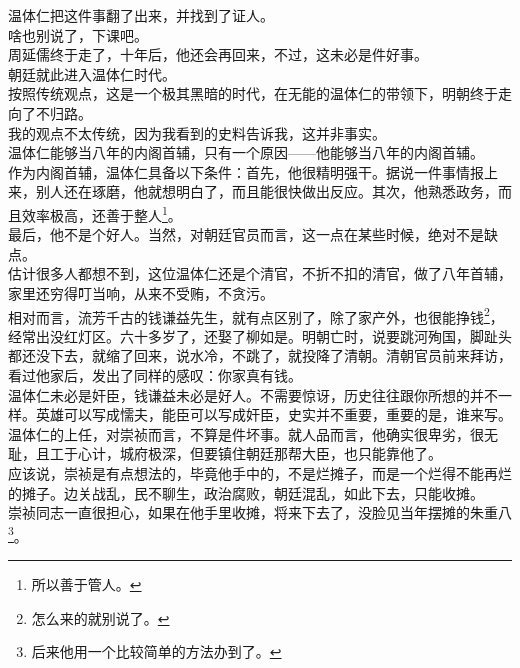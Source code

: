 \begin{multicols}{\theparacolNo}
温体仁把这件事翻了出来，并找到了证人。\\

啥也别说了，下课吧。\\

周延儒终于走了，十年后，他还会再回来，不过，这未必是件好事。\\

朝廷就此进入温体仁时代。\\

按照传统观点，这是一个极其黑暗的时代，在无能的温体仁的带领下，明朝终于走向了不归路。\\

我的观点不太传统，因为我看到的史料告诉我，这并非事实。\\

温体仁能够当八年的内阁首辅，只有一个原因——他能够当八年的内阁首辅。\\

作为内阁首辅，温体仁具备以下条件：首先，他很精明强干。据说一件事情报上来，别人还在琢磨，他就想明白了，而且能很快做出反应。其次，他熟悉政务，而且效率极高，还善于整人\footnote{所以善于管人。}。\\

最后，他不是个好人。当然，对朝廷官员而言，这一点在某些时候，绝对不是缺点。\\

估计很多人都想不到，这位温体仁还是个清官，不折不扣的清官，做了八年首辅，家里还穷得叮当响，从来不受贿，不贪污。\\

相对而言，流芳千古的钱谦益先生，就有点区别了，除了家产外，也很能挣钱\footnote{怎么来的就别说了。}，经常出没红灯区。六十多岁了，还娶了柳如是。明朝亡时，说要跳河殉国，脚趾头都还没下去，就缩了回来，说水冷，不跳了，就投降了清朝。清朝官员前来拜访，看过他家后，发出了同样的感叹：你家真有钱。\\

温体仁未必是奸臣，钱谦益未必是好人。不需要惊讶，历史往往跟你所想的并不一样。英雄可以写成懦夫，能臣可以写成奸臣，史实并不重要，重要的是，谁来写。\\

温体仁的上任，对崇祯而言，不算是件坏事。就人品而言，他确实很卑劣，很无耻，且工于心计，城府极深，但要镇住朝廷那帮大臣，也只能靠他了。\\

应该说，崇祯是有点想法的，毕竟他手中的，不是烂摊子，而是一个烂得不能再烂的摊子。边关战乱，民不聊生，政治腐败，朝廷混乱，如此下去，只能收摊。\\

崇祯同志一直很担心，如果在他手里收摊，将来下去了，没脸见当年摆摊的朱重八\footnote{后来他用一个比较简单的方法办到了。}。\\


\end{multicols}
